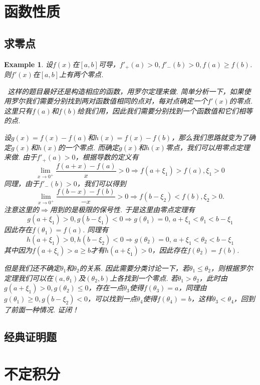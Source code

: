 \documentclass{article}
\newtheorem{example}[theorem]{Example}
\newcommand{\hints}{{\color{blue} \text{hints}}}
\begin{document}
\newpage
\section{函数性质}

\subsection{求零点}

\begin{example}
\rm 设$f(x)$在$[a,b]$可导，$f'_+(a) > 0, f'_-(b) > 0, f(a) \geq f(b)$. 则$f'(x)$在$[a,b]$上有两个零点. 

\hints\ 这样的题目最好还是构造相应的函数，用罗尔定理来做. 简单分析一下，如果使用罗尔我们需要分别找到两对函数值相同的点对，每对点确定一个$f'(x)$的零点. 这里只有$f(a)$和$f(b)$给我们用，因此我们需要分别找到一个函数值和它们相等的点.

设$g(x) = f(x)-f(a)$和$h(x)=f(x)-f(b)$，那么我们思路就变为了确定$g(x)$和$h(x)$的一个零点. 而确定$g(x)$和$h(x)$零点，我们可以用零点定理来做. 由于$f'_+(a) > 0$，根据导数的定义有
$$
\lim\limits_{x \to 0^+} \frac{f(a+x)-f(a)}{x} > 0 \Rightarrow f(a + \xi_1) > f(a),\xi_1 > 0
$$  
同理，由于$f'_-(b) > 0$，我们可以得到
$$
\lim\limits_{x \to 0^+} \frac{f(b-x)-f(b)}{-x} > 0 \Rightarrow f(b - \xi_2) < f(b), \xi_2 > 0.
$$
注意这里的$\Rightarrow$用到的是极限的保号性. 于是这里由零点定理有
$$
g(a + \xi_1) > 0, g(b-\xi_1) < 0 \Rightarrow g(\theta_1) = 0, \,a+\xi_1 < \theta_1 < b-\xi_1
$$
因此存在$f(\theta_1) = f(a)$. 同理有
$$
h(a+\xi_1) > 0, h(b-\xi_2) < 0 \Rightarrow g(\theta_2) = 0, \,a+\xi_1 < \theta_2 < b-\xi_1
$$
其中因为$f(a+\xi_i) > a \geq b$才有$h(a+\xi_1) > 0$，因此存在$f(\theta_2) = f(b)$.  

但是我们还不确定$\theta_1$和$\theta_2$的关系. 因此需要分类讨论一下，若$\theta_1  \leq \theta_2$，则根据罗尔定理我们可以在$(a,\theta_1)$及$(\theta_2,b)$上各找到一个零点. 若$\theta_1 > \theta_2$，此时由$g(a+\xi_1) > 0, g(\theta_2) \leq 0$，存在一点$\theta_3$使得$f(\theta_3) = a$，同理由$g(\theta_1) \geq 0, g(b-\xi_2) < 0$，可以找到一点$\theta_4$使得$f(\theta_4) = b$，这样$\theta_3 < \theta_4$，回到了前面一种情况. 证闭！
\end{example}

\subsection{经典证明题}


\newpage
\section{不定积分}
\end{document}
